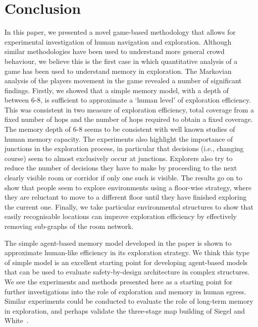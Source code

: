 \section{Conclusion} %
\label{sec:conclusion}

In this paper, we presented a novel game-based methodology that allows for experimental investigation of human navigation and exploration. Although similar methodologies have been used to understand more general crowd behaviour, we believe this is the first case in which quantitative analysis of a game has been used to understand memory in exploration. The Markovian analysis of the players movement in the game revealed a number of significant findings. Firstly, we showed that a simple memory model, with a depth of between 6-8, is sufficient to approximate a `human level' of exploration efficiency. This was consistent in two measure of exploration efficiency, total coverage from a fixed number of hops and the number of hops required to obtain a fixed coverage. The memory depth of 6-8 seems to be consistent with well known studies of human memory capacity. The experiments also highlight the importance of junctions in the exploration process, in particular that decisions (i.e., changing course) seem to almost exclusively occur at junctions. Explorers also try to reduce the number of decisions they have to make by proceeding to the next clearly visible room or corridor if only one such is visible. The results go on to show that people seem to explore environments using a floor-wise strategy, where they are reluctant to move to a different floor until they have finished exploring the current one. Finally, we take particular environmental structures to show that easily recognisable locations can improve exploration efficiency by effectively removing sub-graphs of the room network.

The simple agent-based memory model developed in the paper is shown to approximate human-like efficiency in its exploration strategy. We think this type of simple model is an excellent starting point for developing agent-based models that can be used to evaluate safety-by-design architecture in complex structures. We see the experiments and methods presented here as a starting point for further investigations into the role of exploration and memory in human egress. Similar experiments could be conducted to evaluate the role of long-term memory in exploration, and perhaps validate the three-stage map building of Siegel and White~\cite{Siegel19759}.




